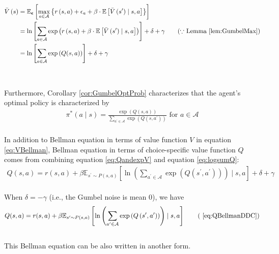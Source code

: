 \;
\begin{align}
\bar{V}\left(s\right) &=\mathbb{E}_{
\boldsymbol{\epsilon}}\left[\max _{a \in \mathcal{A}}\left\{r\left(s, a\right)+\epsilon_{a}+\beta \cdot \mathbb{E}\left[\bar{V}\left(s^\prime\right)\mid s, a\right]\right\}\right]\label{eq:DP_DDC_pre} 
\\
&=\ln \left[\sum_{a\in \mathcal{A}}\exp\left(r\left(s, a\right)+\beta \cdot \mathbb{E}\left[\bar{V}\left(s^\prime\right)\mid s, a\right]\right)\right] + \delta + \gamma \tag{$\because$ Lemma \ref{lem:GumbelMax}}\label{eq:DP_DDC}
\\
&=\ln \left[\sum_{a\in \mathcal{A}}\exp\left(Q(s,a)\right)\right]  + \delta + \gamma \label{eq:logsumQ}
\end{align}
\\
\;
\\
Furthermore, Corollary \ref{cor:GumbelOptProb} characterizes that the agent's optimal policy is characterized by 
\begin{align}
    \pi^*(a \mid s) =\frac{\exp \left({Q(s, a)}\right)}{\sum_{a^\prime\in \mathcal{A}} \exp \left({Q(s, a^\prime)}\right)} \text{ for } a\in \mathcal{A} \label{eq:DDCopt}
\end{align}
\;
\\
In addition to Bellman equation in terms of value function $V$ in equation \ref{eq:VBellman}, 
Bellman equation in terms of choice-specific value function $Q$ comes from combining equation \ref{eq:QandexpV} and equation \ref{eq:logsumQ}:
\begin{align}
    Q(s, a)=r(s, a)+\beta \mathbb{E}_{s^\prime \sim P(s, a)}\left[\ln \left(\sum_{a^{\prime} \in \mathcal{A}} \exp \left(Q\left(s^{\prime}, a^{\prime}\right)\right)\right)\mid s, a\right] + \delta + \gamma
\end{align}
\;
\\
When $\delta = -\gamma$ (i.e., the Gumbel noise is mean 0), we have 
\begin{align}
    Q(s, a)=r(s, a)+\beta \mathbb{E}_{s^\prime \sim P(s, a)}\left[\ln \left(\sum_{a^{\prime} \in \mathcal{A}} \exp \left(Q\left(s^{\prime}, a^{\prime}\right)\right)\right)\mid s, a\right] \tag{ \ref{eq:QBellmanDDC}}
\end{align}
\;
\\
This Bellman equation can be also written in another form.

